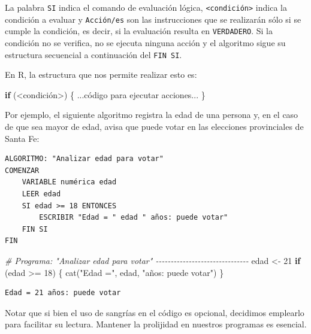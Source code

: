 \documentclass[
]{book}
\newenvironment{Shaded}{\begin{snugshade}}{\end{snugshade}}
\newcommand{\CommentTok}[1]{\textcolor[rgb]{0.56,0.35,0.01}{\textit{#1}}}
\newcommand{\ControlFlowTok}[1]{\textcolor[rgb]{0.13,0.29,0.53}{\textbf{#1}}}
\newcommand{\DecValTok}[1]{\textcolor[rgb]{0.00,0.00,0.81}{#1}}
\newcommand{\FunctionTok}[1]{\textcolor[rgb]{0.00,0.00,0.00}{#1}}
\newcommand{\NormalTok}[1]{#1}
\newcommand{\OtherTok}[1]{\textcolor[rgb]{0.56,0.35,0.01}{#1}}
\newcommand{\SpecialCharTok}[1]{\textcolor[rgb]{0.00,0.00,0.00}{#1}}
\newcommand{\StringTok}[1]{\textcolor[rgb]{0.31,0.60,0.02}{#1}}
\begin{document}
La palabra \texttt{SI} indica el comando de evaluación lógica, \texttt{\textless{}condición\textgreater{}} indica la condición a evaluar y \texttt{Acción/es} son las instrucciones que se realizarán sólo si se cumple la condición, es decir, si la evaluación resulta en \texttt{VERDADERO}. Si la condición no se verifica, no se ejecuta ninguna acción y el algoritmo sigue su estructura secuencial a continuación del \texttt{FIN\ SI}.

En R, la estructura que nos permite realizar esto es:

\begin{Shaded}
\begin{Highlighting}[]
\ControlFlowTok{if}\NormalTok{ (}\SpecialCharTok{\textless{}}\NormalTok{condición}\SpecialCharTok{\textgreater{}}\NormalTok{) \{}
\NormalTok{    ...código para ejecutar acciones...}
\NormalTok{\}}
\end{Highlighting}
\end{Shaded}

Por ejemplo, el siguiente algoritmo registra la edad de una persona y, en el caso de que sea mayor de edad, avisa que puede votar en las elecciones provinciales de Santa Fe:

\begin{verbatim}
ALGORITMO: "Analizar edad para votar"
COMENZAR
    VARIABLE numérica edad
    LEER edad
    SI edad >= 18 ENTONCES
        ESCRIBIR "Edad = " edad " años: puede votar"
    FIN SI
FIN
\end{verbatim}

\begin{Shaded}
\begin{Highlighting}[]
\CommentTok{\# Programa: "Analizar edad para votar" {-}{-}{-}{-}{-}{-}{-}{-}{-}{-}{-}{-}{-}{-}{-}{-}{-}{-}{-}{-}{-}{-}{-}{-}{-}{-}{-}{-}{-}{-}{-}}
\NormalTok{edad }\OtherTok{\textless{}{-}} \DecValTok{21}
\ControlFlowTok{if}\NormalTok{ (edad }\SpecialCharTok{\textgreater{}=} \DecValTok{18}\NormalTok{) \{}
    \FunctionTok{cat}\NormalTok{(}\StringTok{"Edad ="}\NormalTok{, edad, }\StringTok{"años: puede votar"}\NormalTok{)}
\NormalTok{\}}
\end{Highlighting}
\end{Shaded}

\begin{verbatim}
Edad = 21 años: puede votar
\end{verbatim}

Notar que si bien el uso de sangrías en el código es opcional, decidimos emplearlo para facilitar su lectura. Mantener la prolijidad en nuestros programas es esencial.
\end{document}
